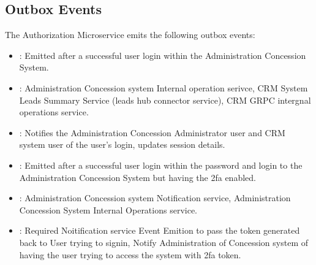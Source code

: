 \documentclass[letterpaper,10pt,english]{sphinxmanual}
\begin{document}
\subsection{Outbox Events}
\label{\detokenize{administration_concession_system/authorization_service:outbox-events}}
\sphinxAtStartPar
The Authorization Microservice emits the following outbox events:

\sphinxAtStartPar
{}
\begin{itemize}
\item {} 
\sphinxAtStartPar
{}: Emitted after a successful user login within the Administration Concession System.

\item {} 
\sphinxAtStartPar
{}: Administration Concession system Internal operation serivce, CRM System Leads Summary Service (leads hub connector service), CRM GRPC intergnal operations service.

\item {} 
\sphinxAtStartPar
{}: Notifies the Administration Concession Administrator user and CRM system user of the user’s login, updates session details.

\end{itemize}

\sphinxAtStartPar
{}
\begin{itemize}
\item {} 
\sphinxAtStartPar
{}: Emitted after a successful user login within the password and login to  the Administration Concession System but having the 2fa enabled.

\item {} 
\sphinxAtStartPar
{}: Administration Concession system Notification service, Administration Concession System Internal Operations service.

\item {} 
\sphinxAtStartPar
{}: Required Noitification service Event Emition to pass the token generated back to User trying to sign\sphinxhyphen{}in, Notify Administration of Concession system of having the user trying to access the system with 2fa token.

\end{itemize}
\end{document}
